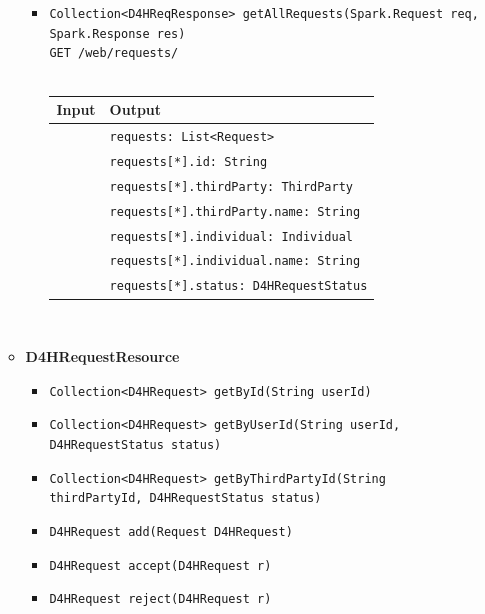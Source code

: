 \documentclass[a4paper, hidelinks, 12pt]{report}
\begin{document}
\begin{itemize}
\begin{itemize}
\begin{itemize}
			\item{\verb|Collection<D4HReqResponse> getAllRequests(Spark.Request req,|\\ \verb|Spark.Response res)|\\ \verb|GET /web/requests/|}\\\\
			\begin{tabular}{l | l}
			\textbf{Input} & \textbf{Output} \\
			\hline
				& \verb|requests: List<Request>| \\
				& \verb|requests[*].id: String| \\
				& \verb|requests[*].thirdParty: ThirdParty| \\
				& \verb|requests[*].thirdParty.name: String| \\
				& \verb|requests[*].individual: Individual| \\
				& \verb|requests[*].individual.name: String| \\
				& \verb|requests[*].status: D4HRequestStatus| \\
			\end{tabular}\\
		\end{itemize}		
				
				\item{\textbf{D4HRequestResource}}
					\begin{itemize}
						\item{\verb|Collection<D4HRequest> getById(String userId)|}
						\item{\verb|Collection<D4HRequest> getByUserId(String userId, D4HRequestStatus status)|}
						\item{\verb|Collection<D4HRequest> getByThirdPartyId(String thirdPartyId, D4HRequestStatus status)|}		
						\item{\verb|D4HRequest add(Request D4HRequest)|}
						\item{\verb|D4HRequest accept(D4HRequest r)|}
						\item{\verb|D4HRequest reject(D4HRequest r)|}
					\end{itemize}
			\end{itemize}	
			

\end{itemize}
\end{document}

